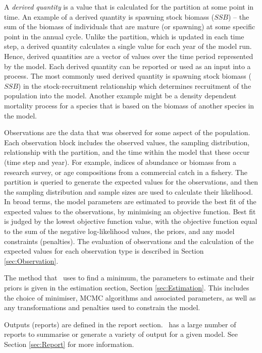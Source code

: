 A \emph{derived quantity} is a value that is calculated for the partition at some point in time. An example of a derived quantity is spawning stock biomass ($SSB$) -- the sum of the biomass of individuals that are mature (or spawning) at some specific point in the annual cycle. Unlike the partition, which is updated in each time step, a derived quantity calculates a single value for each year of the model run. Hence, derived quantities are a vector of values over the time period represented by the model. Each derived quantity can be reported or used as an input into a process. The most commonly used derived quantity is spawning stock biomass ($SSB$) in the stock-recruitment relationship which determines recruitment of the population into the model. Another example might be a density dependent mortality process for a species that is based on the biomass of another species in the model.

Observations are the data that was observed for some aspect of the population. Each observation block includes the observed values, the sampling distribution, relationship with the partition, and the time within the model that these occur (time step and year). For example, indices of abundance or biomass from a research survey, or age compositions from a commercial catch in a fishery. The partition is queried to generate the expected values for the observations, and then the sampling distribution and sample sizes are used to calculate their likelihood. In broad terms, the model parameters are estimated to provide the best fit of the expected values to the observations, by minimising an objective function. Best fit is judged by the lowest objective function value, with the objective function equal to the sum of the negative log-likelihood values, the priors, and any model constraints (penalties). The evaluation of observations and the calculation of the expected values for each observation type is described in Section \ref{sec:Observation}.

The method that \CNAME\ uses to find a minimum, the parameters to estimate and their priors is given in the estimation section, Section \ref{sec:Estimation}. This includes the choice of minimiser, MCMC algorithms and associated parameters, as well as any transformations and penalties used to constrain the model.

Outputs (reports) are defined in the report section. \CNAME\ has a large number of reports to summarise or generate a variety of output for a given model. See Section \ref{sec:Report} for more information.

